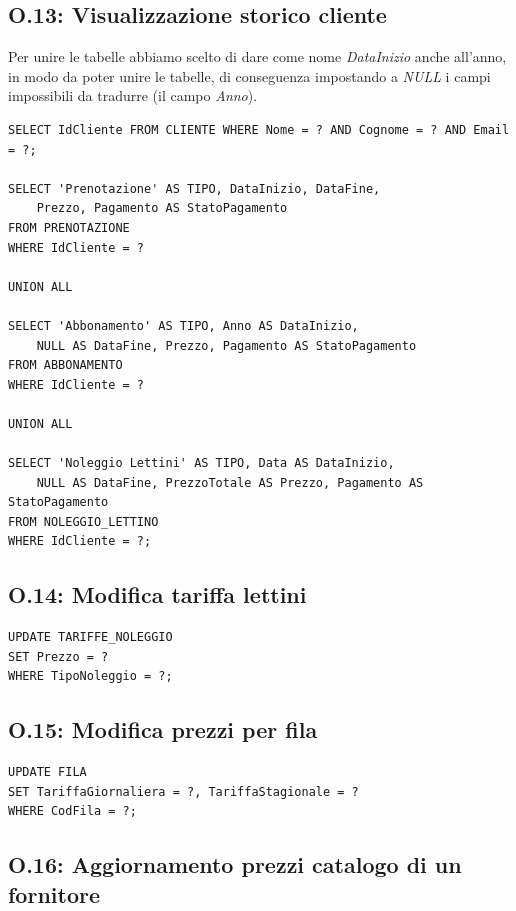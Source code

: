 \subsection*{O.13: Visualizzazione storico cliente} %

Per unire le tabelle abbiamo scelto di dare come nome \textit{DataInizio} anche
all'anno, in modo da poter unire le tabelle, di conseguenza impostando a \textit{NULL}
i campi impossibili da tradurre (il campo \textit{Anno}).

\begin{lstlisting}[caption={O.13: Visualizzazione storico cliente}] 
SELECT IdCliente FROM CLIENTE WHERE Nome = ? AND Cognome = ? AND Email = ?;

SELECT 'Prenotazione' AS TIPO, DataInizio, DataFine, 
    Prezzo, Pagamento AS StatoPagamento
FROM PRENOTAZIONE 
WHERE IdCliente = ?

UNION ALL

SELECT 'Abbonamento' AS TIPO, Anno AS DataInizio, 
    NULL AS DataFine, Prezzo, Pagamento AS StatoPagamento 
FROM ABBONAMENTO 
WHERE IdCliente = ?

UNION ALL

SELECT 'Noleggio Lettini' AS TIPO, Data AS DataInizio, 
    NULL AS DataFine, PrezzoTotale AS Prezzo, Pagamento AS StatoPagamento
FROM NOLEGGIO_LETTINO 
WHERE IdCliente = ?;
\end{lstlisting}

\subsection*{O.14: Modifica tariffa lettini}

\begin{lstlisting}[caption={O.14: Modifica tariffa lettini}]
UPDATE TARIFFE_NOLEGGIO
SET Prezzo = ?
WHERE TipoNoleggio = ?;
\end{lstlisting}

\subsection*{O.15: Modifica prezzi per fila}

\begin{lstlisting}[caption={O.15: Modifica prezzi per fila}]
UPDATE FILA
SET TariffaGiornaliera = ?, TariffaStagionale = ?
WHERE CodFila = ?;
\end{lstlisting}

\subsection*{O.16: Aggiornamento prezzi catalogo di un fornitore}

